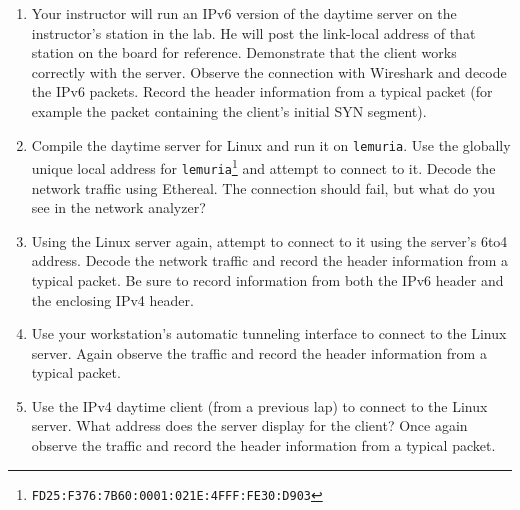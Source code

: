 \documentclass[twocolumn]{article}
\begin{document}
\begin{enumerate}

\item Your instructor will run an IPv6 version of the daytime server on the instructor's station
  in the lab. He will post the link-local address of that station on the board for reference.
  Demonstrate that the client works correctly with the server. Observe the connection with
  Wireshark and decode the IPv6 packets. Record the header information from a typical packet
  (for example the packet containing the client's initial SYN segment).

\item Compile the daytime server for Linux and run it on \texttt{lemuria}. Use the globally
  unique local address for
  \texttt{lemuria}\footnote{\texttt{FD25:F376:7B60:0001:021E:4FFF:FE30:D903}} and attempt to
  connect to it. Decode the network traffic using Ethereal. The connection should fail, but what
  do you see in the network analyzer?

\item Using the Linux server again, attempt to connect to it using the server's 6to4 address.
  Decode the network traffic and record the header information from a typical packet. Be sure to
  record information from both the IPv6 header and the enclosing IPv4 header.

\item Use your workstation's automatic tunneling interface to connect to the Linux server. Again
  observe the traffic and record the header information from a typical packet.

\item Use the IPv4 daytime client (from a previous lap) to connect to the Linux server. What
  address does the server display for the client? Once again observe the traffic and record the
  header information from a typical packet.

\end{enumerate}
\end{document}

